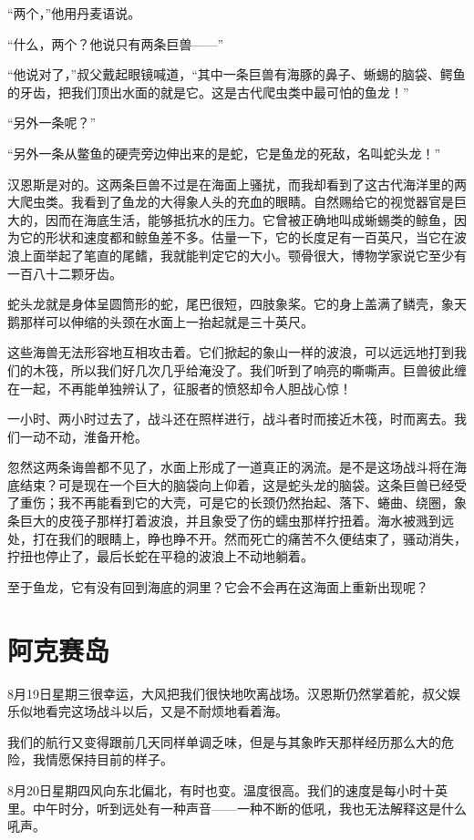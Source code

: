 \documentclass[10pt]{book}
\begin{document}
“两个，”他用丹麦语说。

“什么，两个？他说只有两条巨兽——”

“他说对了，”叔父戴起眼镜喊道，“其中一条巨兽有海豚的鼻子、蜥蜴的脑袋、鳄鱼的牙齿，把我们顶出水面的就是它。这是古代爬虫类中最可怕的鱼龙！”

“另外一条呢？”

“另外一条从鳖鱼的硬壳旁边伸出来的是蛇，它是鱼龙的死敌，名叫蛇头龙！”

汉恩斯是对的。这两条巨兽不过是在海面上骚扰，而我却看到了这古代海洋里的两大爬虫类。我看到了鱼龙的大得象人头的充血的眼睛。自然赐给它的视觉器官是巨大的，因而在海底生活，能够抵抗水的压力。它曾被正确地叫成蜥蜴类的鲸鱼，因为它的形状和速度都和鲸鱼差不多。估量一下，它的长度足有一百英尺，当它在波浪上面举起了笔直的尾鳍，我就能判定它的大小。颚骨很大，博物学家说它至少有一百八十二颗牙齿。

蛇头龙就是身体呈圆筒形的蛇，尾巴很短，四肢象桨。它的身上盖满了鳞壳，象天鹅那样可以伸缩的头颈在水面上一抬起就是三十英尺。

这些海兽无法形容地互相攻击着。它们掀起的象山一样的波浪，可以远远地打到我们的木筏，所以我们好几次几乎给淹没了。我们听到了响亮的嘶嘶声。巨兽彼此缠在一起，不再能单独辨认了，征服者的愤怒却令人胆战心惊！

一小时、两小时过去了，战斗还在照样进行，战斗者时而接近木筏，时而离去。我们一动不动，淮备开枪。

忽然这两条诲兽都不见了，水面上形成了一道真正的涡流。是不是这场战斗将在海底结束？可是现在一个巨大的脑袋向上仰着，这是蛇头龙的脑袋。这条巨兽已经受了重伤；我不再能看到它的大壳，可是它的长颈仍然抬起、落下、蜷曲、绕圈，象条巨大的皮筏子那样打着波浪，并且象受了伤的蠕虫那样拧扭着。海水被溅到远处，打在我们的眼睛上，睁也睁不开。然而死亡的痛苦不久便结束了，骚动消失，拧扭也停止了，最后长蛇在平稳的波浪上不动地躺着。

至于鱼龙，它有没有回到海底的洞里？它会不会再在这海面上重新出现呢？
\chapter{阿克赛岛}
8月19日星期三很幸运，大风把我们很快地吹离战场。汉恩斯仍然掌着舵，叔父娱乐似地看完这场战斗以后，又是不耐烦地看着海。

我们的航行又变得跟前几天同样单调乏味，但是与其象昨天那样经历那么大的危险，我情愿保持目前的样子。

8月20日星期四风向东北偏北，有时也变。温度很高。我们的速度是每小时十英里。中午时分，听到远处有一种声音——一种不断的低吼，我也无法解释这是什么吼声。
\end{document}
